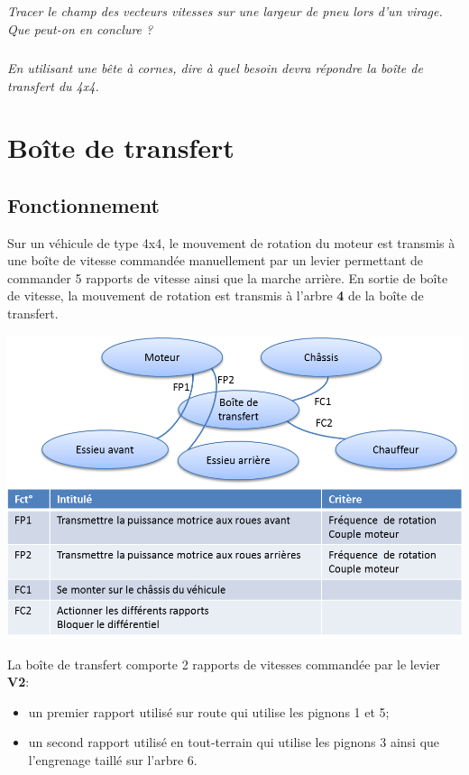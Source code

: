 \documentclass[10pt]{article}
\begin{document}
\subparagraph{}
\textit{Tracer le champ des vecteurs vitesses sur une largeur de pneu lors d'un virage. Que peut-on en conclure ?}



\subparagraph{}
\textit{En utilisant une bête à cornes, dire à quel besoin devra répondre la boîte de transfert du 4x4.}


\section{Boîte de transfert}

\subsection{Fonctionnement}

Sur un véhicule de type 4x4, le mouvement de rotation du moteur est transmis à une boîte de vitesse commandée manuellement par un levier permettant de commander 5 rapports de vitesse ainsi que la marche arrière. En sortie de boîte de vitesse, la mouvement de rotation est transmis à l'arbre \textbf{4} de la boîte de transfert. 

\begin{center}
\includegraphics[width=.85\textwidth]{images/af}
\end{center}

La boîte de transfert comporte 2 rapports de vitesses commandée par le levier  \textbf{V2}: 
\begin{itemize}
\item un premier rapport utilisé sur route qui utilise les pignons 1 et 5;
\item un second rapport utilisé en tout-terrain qui utilise les pignons 3 ainsi que l'engrenage taillé sur l'arbre 6.
\end{itemize}
\end{document}
